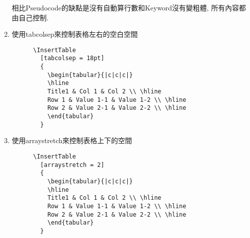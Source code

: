 \begin{enumerate}
相比Pseudocode的缺點是沒有自動算行數和Keyword沒有變粗體, 所有內容都由自己控制.


  \newpage
  \item
  {
    使用tabcolsep來控制表格左右的空白空間

    \begin{verbatim}
      \InsertTable
        [tabcolsep = 18pt]
        {
          \begin{tabular}{|c|c|c|}
          \hline
          Title1 & Col 1 & Col 2 \\ \hline
          Row 1 & Value 1-1 & Value 1-2 \\ \hline
          Row 2 & Value 2-1 & Value 2-2 \\ \hline
          \end{tabular}
        }
    \end{verbatim}

  } %

  \newpage
  \item
  {
    使用arraystretch來控制表格上下的空間

    \begin{verbatim}
      \InsertTable
        [arraystretch = 2]
        {
          \begin{tabular}{|c|c|c|}
          \hline
          Title1 & Col 1 & Col 2 \\ \hline
          Row 1 & Value 1-1 & Value 1-2 \\ \hline
          Row 2 & Value 2-1 & Value 2-2 \\ \hline
          \end{tabular}
        }
    \end{verbatim}

  } %

  \end{enumerate}

